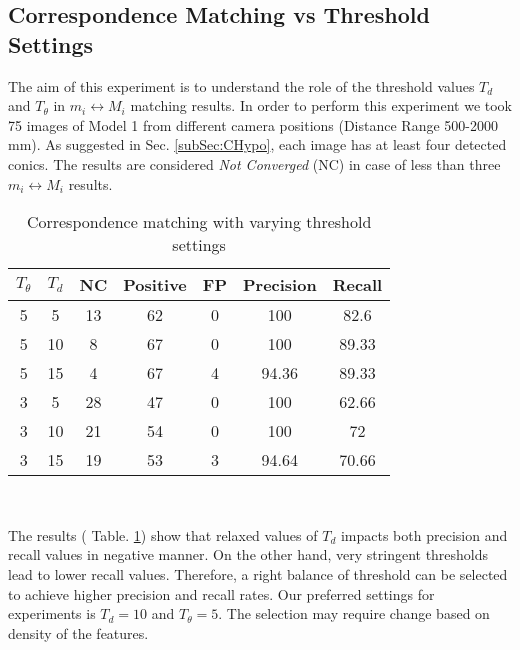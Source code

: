 \documentclass{bmvc2k}
\begin{document}
\subsection{Correspondence Matching vs Threshold Settings}
The aim of this experiment is to understand the role of the threshold values $ T_{d}$ and $ T_\theta $ in $ m_i \leftrightarrow M_i $ matching results. 
In order to perform this experiment we took 75 images of Model 1 from different camera positions (Distance Range 500-2000 mm). 
As suggested in Sec. \ref{subSec:CHypo}, each image has at least four detected conics. 
The results are considered \textit{Not Converged} (NC) in case of less than three $ m_i \leftrightarrow M_i $ results.

\begin{table}[tb]
\centering
\caption{Correspondence matching with varying threshold settings } \label{table:ThresholdEffect}
\begin{tabular}{ | c | c | c | c | c | c| c |}
\hline
$ T_\theta $ & $ T_{d} $ & NC & Positive & FP & Precision & Recall \\ \hline
5 & 5  & 13 & 62 & 0 & 100 & 82.6 \\
5 & 10 & 8 & 67 & 0 & 100 & 89.33\\
5 & 15 & 4 & 67  & 4 & 94.36 & 89.33\\ \hline
3 & 5  & 28 & 47  & 0 & 100 & 62.66 \\
3 & 10 & 21 & 54  & 0 & 100 & 72 \\
3 & 15 & 19 & 53  & 3 & 94.64 & 70.66 \\ \hline
\end{tabular} \\
\label{tab:Exp2}
\end{table}

\par 
The results ( Table. \ref{tab:Exp2}) show that relaxed values of $ T_{d} $ impacts both precision and recall values in negative manner. 
On the other hand, very stringent thresholds lead to lower recall values. Therefore, a right balance of threshold can be selected to achieve higher precision and recall rates. Our preferred settings for experiments is $ T_{d} = 10 $ and $ T_\theta = 5 $. The selection may require change based on density of the features. 
\end{document}
